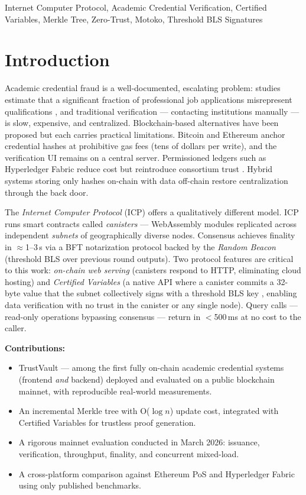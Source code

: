 \documentclass[conference,a4paper]{IEEEtran}
\begin{document}
\begin{IEEEkeywords}
Internet Computer Protocol, Academic Credential Verification, Certified Variables, Merkle Tree, Zero-Trust, Motoko, Threshold BLS Signatures
\end{IEEEkeywords}

\section{Introduction}
\label{sec:intro}

Academic credential fraud is a well-documented, escalating problem: studies estimate that a significant fraction of professional job applications misrepresent qualifications \cite{chahal2021credential}, and traditional verification — contacting institutions manually — is slow, expensive, and centralized. Blockchain-based alternatives have been proposed but each carries practical limitations. Bitcoin and Ethereum anchor credential hashes at prohibitive gas fees (tens of dollars per write), and the verification UI remains on a central server. Permissioned ledgers such as Hyperledger Fabric reduce cost but reintroduce consortium trust \cite{androulaki2018fabric}. Hybrid systems storing only hashes on-chain with data off-chain restore centralization through the back door.

The \textit{Internet Computer Protocol} (ICP) \cite{hanke2018dfinity} offers a qualitatively different model. ICP runs smart contracts called \textit{canisters} — WebAssembly modules replicated across independent \textit{subnets} of geographically diverse nodes. Consensus achieves finality in $\approx$1--3\,s via a BFT notarization protocol backed by the \textit{Random Beacon} (threshold BLS over previous round outputs). Two protocol features are critical to this work: \textit{on-chain web serving} (canisters respond to HTTP, eliminating cloud hosting) and \textit{Certified Variables} (a native API where a canister commits a 32-byte value that the subnet collectively signs with a threshold BLS key \cite{dfinity2022geeks}, enabling data verification with no trust in the canister or any single node). Query calls — read-only operations bypassing consensus — return in $<$500\,ms at no cost to the caller.

\textbf{Contributions:}
\begin{itemize}
  \item TrustVault — among the first fully on-chain academic credential systems (frontend \emph{and} backend) deployed and evaluated on a public blockchain mainnet, with reproducible real-world measurements.
  \item An incremental Merkle tree with O($\log n$) update cost, integrated with Certified Variables for trustless proof generation.
  \item A rigorous mainnet evaluation conducted in March 2026: issuance, verification, throughput, finality, and concurrent mixed-load.
  \item A cross-platform comparison against Ethereum PoS \cite{buterin2020eth2} and Hyperledger Fabric \cite{androulaki2018fabric} using only published benchmarks.
\end{itemize}
\end{document}
